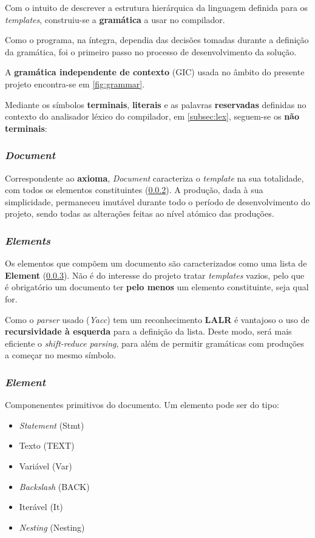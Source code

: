 \documentclass[../relatorio.tex]{subfiles}
\begin{document}
Com o intuito de descrever a estrutura hierárquica da linguagem
definida para os \textit{templates}, construiu-se a \textbf{gramática} 
a usar no compilador. 

Como o programa, na íntegra, dependia das decisões tomadas durante
a definição da gramática, foi o primeiro passo no processo de desenvolvimento
da solução.

A \textbf{gramática independente de contexto} (GIC) usada 
no âmbito do presente projeto encontra-se em \ref{fig:grammar}.

Mediante os símbolos \textbf{terminais}, \textbf{literais} e as palavras 
\textbf{reservadas} definidas no contexto do analisador léxico do 
compilador, em \ref{subsec:lex}, seguem-se os \textbf{não terminais}:

\subsubsection{\textit{Document}}\label{grm:doc}
Correspondente ao \textbf{axioma},
\textit{Document} caracteriza o \textit{template} na sua totalidade,
com todos os elementos constituintes (\ref{grm:elems}).
A produção, dada à sua simplicidade, permaneceu imutável durante todo o período de
desenvolvimento do projeto, sendo todas as alterações 
feitas ao nível atómico das produções.

\subsubsection{\textit{Elements}} \label{grm:elems}
Os elementos que compõem um documento são caracterizados como uma lista 
de \textbf{Element} (\ref{grm:elem}). 
Não é do interesse do projeto tratar \textit{templates} vazios, pelo que 
é obrigatório um documento ter \textbf{pelo menos} um 
elemento constituinte, seja qual for. 

Como o \textit{parser} usado (\textit{Yacc}) tem um reconhecimento \textbf{LALR}
é vantajoso o uso de \textbf{recursividade à esquerda} para a definição da lista.
Deste modo, será mais eficiente o \textit{shift-reduce parsing}, para além
de permitir gramáticas com produções a começar no mesmo símbolo.

\subsubsection{\textit{Element}}\label{grm:elem}
Componenentes primitivos do documento. 
Um elemento pode ser do tipo:
\begin{itemize}
    \item \textit{Statement}    (Stmt)
    \item Texto                 (TEXT)
    \item Variável              (Var)
    \item \textit{Backslash}    (BACK)
    \item Iterável              (It)
    \item \textit{Nesting}      (Nesting)
\end{itemize}
\end{document}
